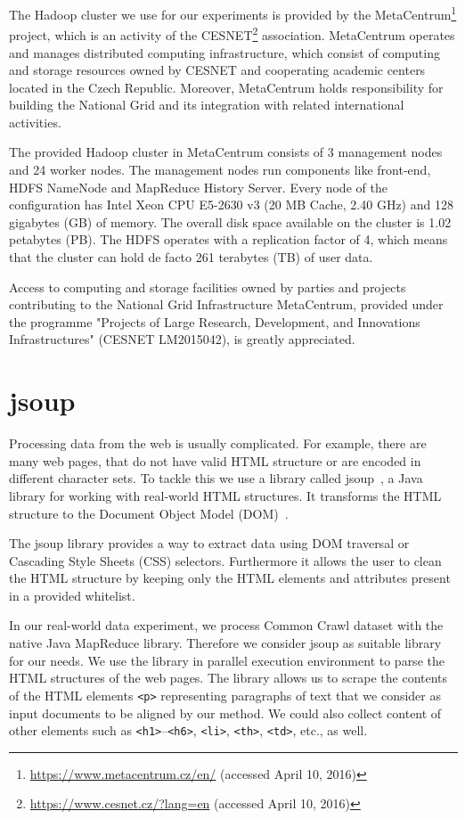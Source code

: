 The Hadoop cluster we use for our experiments is provided by the MetaCentrum\footnote{\url{https://www.metacentrum.cz/en/} (accessed April 10, 2016)} project, which is an activity of the CESNET\footnote{\url{https://www.cesnet.cz/?lang=en} (accessed April 10, 2016)} association. MetaCentrum operates and manages distributed computing infrastructure, which consist of computing and storage resources owned by CESNET and cooperating academic centers located in the Czech Republic. Moreover, MetaCentrum holds responsibility for building the National Grid and its integration with related international activities.

The provided Hadoop cluster in MetaCentrum consists of 3 management nodes and 24 worker nodes. The management nodes run components like front-end, HDFS NameNode and MapReduce History Server. Every node of the configuration has Intel\textregistered{} Xeon\textregistered{} CPU E5-2630 v3 (20 MB Cache, 2.40 GHz) and 128 gigabytes (GB) of memory. The overall disk space available on the cluster is 1.02 petabytes (PB). The HDFS operates with a replication factor of 4, which means that the cluster can hold de facto 261 terabytes (TB) of user data.

Access to computing and storage facilities owned by parties and projects contributing to the National Grid Infrastructure MetaCentrum, provided under the programme "Projects of Large Research, Development, and Innovations Infrastructures" (CESNET LM2015042), is greatly appreciated.

\section{jsoup}
\label{section:jsoup}

Processing data from the web is usually complicated. For example, there are many web pages, that do not have valid HTML structure or are encoded in different character sets. To tackle this we use a library called jsoup~\cite{jsoup}, a Java library for working with real-world HTML structures. It transforms the HTML structure to the Document Object Model (DOM)~\cite{DOM}.

The jsoup library provides a way to extract data using DOM traversal or Cascading Style Sheets (CSS) selectors. Furthermore it allows the user to clean the HTML structure by keeping only the HTML elements and attributes present in a provided whitelist.

In our real-world data experiment, we process Common Crawl dataset with the native Java MapReduce library. Therefore we consider jsoup as suitable library for our needs. We use the library in parallel execution environment to parse the HTML structures of the web pages. The library allows us to scrape the contents of the HTML elements \texttt{<p>} representing paragraphs of text that we consider as input documents to be aligned by our method. We could also collect content of other elements such as \texttt{<h1>}--\texttt{<h6>}, \texttt{<li>}, \texttt{<th>}, \texttt{<td>}, etc., as well.

